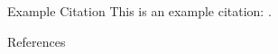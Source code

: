 \begin{frame}{Example Citation}
	This is an example citation: \cite{Einstein1905}.
\end{frame}

\begin{frame}{References}
	\nocite{*} %
	\printbibliography[heading=none]
\end{frame}
